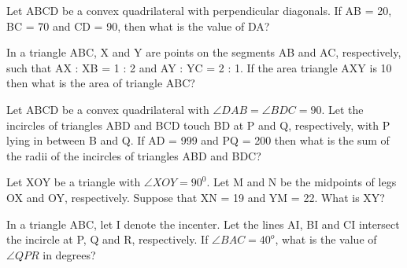 \item Let ABCD be a convex quadrilateral with perpendicular diagonals. If AB = 20, BC = 70 and CD = 90, then what is the value of DA?

\item In a triangle ABC, X and Y are points on the segments AB and AC, respectively, such that AX : XB = 1 : 2 and AY : YC = 2 : 1. If the area triangle AXY is 10 then what is the area of triangle ABC?

\item Let ABCD be a convex quadrilateral with $\angle DAB = \angle BDC = 90$. Let the incircles of triangles ABD and BCD touch BD at P and Q, respectively, with P lying in between B and Q. If AD = 999 and PQ = 200 then what is the sum of the radii of the incircles of triangles ABD and BDC? 

\item Let XOY be a triangle with $\angle XOY = 90^0$. Let M and  N be the midpoints of legs OX and OY, respectively. Suppose that XN = 19 and YM = 22. What is  XY?

\item In a triangle ABC, let I denote the incenter. Let the lines AI, BI and CI intersect the incircle at P, Q and R, respectively. If $\angle BAC = 40^{o}$, what is the value of $\angle QPR$ in degrees?


